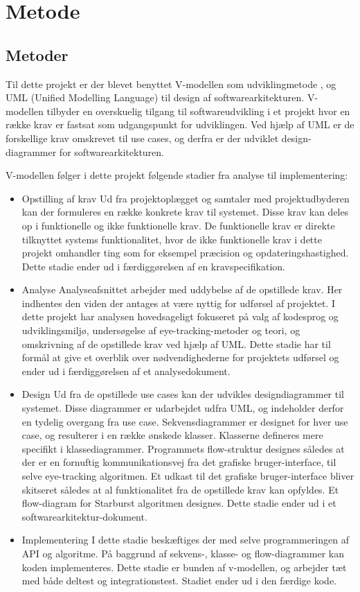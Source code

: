 \documentclass[rapport.tex]{subfiles}
\begin{document}
\section{Metode}
	\subsection{Metoder}
	Til dette projekt er der blevet benyttet V-modellen som udviklingmetode \cite{Vmodel}, og UML (Unified Modelling Language) \cite{UML} til design af softwarearkitekturen. V-modellen tilbyder en overskuelig tilgang til softwareudvikling i et projekt hvor en række krav er fastsat som udgangspunkt for udviklingen. Ved hjælp af UML er de forskellige krav omskrevet til use cases, og derfra er der udviklet design-diagrammer for softwarearkitekturen. 
	
	V-modellen følger i dette projekt følgende stadier fra analyse til implementering:
	\begin{itemize}
		\item Opstilling af krav
		\subitem Ud fra projektoplægget og samtaler med projektudbyderen kan der formuleres en række konkrete krav til systemet. Disse krav kan deles op i funktionelle og ikke funktionelle krav. De funktionelle krav er direkte tilknyttet systems funktionalitet, hvor de ikke funktionelle krav i dette projekt omhandler ting som for eksempel præcision og opdateringshastighed. Dette stadie ender ud i færdiggørelsen af en kravspecifikation. 
		\item Analyse
		\subitem Analyseafsnittet arbejder med uddybelse af de opstillede krav. Her indhentes den viden der antages at være nyttig for udførsel af projektet. I dette projekt har analysen hovedsageligt fokuseret på valg af kodesprog og udviklingsmiljø, undersøgelse af eye-tracking-metoder og teori, og omskrivning af de opstillede krav ved hjælp af UML. Dette stadie har til formål at give et overblik over nødvendighederne for projektets udførsel og ender ud i færdiggørelsen af et analysedokument.  
		\item Design
		\subitem Ud fra de opstillede use cases kan der udvikles designdiagrammer til systemet. Disse diagrammer er udarbejdet udfra UML, og indeholder derfor en tydelig overgang fra use case. Sekvensdiagrammer er designet for hver use case, og resulterer i en række ønskede klasser. Klasserne defineres mere specifikt i klassediagrammer. Programmets flow-struktur designes således at der er en fornuftig kommunikationsvej fra det grafiske bruger-interface, til selve eye-tracking algoritmen. Et udkast til det grafiske bruger-interface bliver skitseret således at al funktionalitet fra de opstillede krav kan opfyldes. Et flow-diagram for Starburst algoritmen designes. Dette stadie ender ud i et softwarearkitektur-dokument. 
		\item Implementering
		\subitem I dette stadie beskæftiges der med selve programmeringen af API og algoritme. På baggrund af sekvens-, klasse- og flow-diagrammer kan koden implementeres. Dette stadie er bunden af v-modellen, og arbejder tæt med både deltest og integrationstest. Stadiet ender ud i den færdige kode. 
	\end{itemize}	
\end{document}
